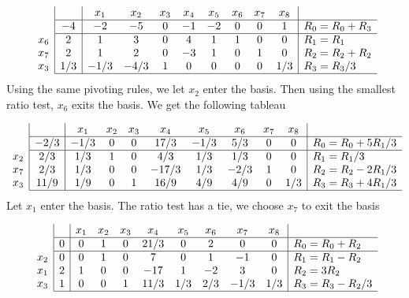 $$
\begin{array}{c}
\\
\\
x_6\\
x_7 \\
x_3 \\ 
\end{array}
\begin{array}{|c|cccccccc|l}
     & x_1 & x_2 & x_3 & x_4 & x_5 & x_6 & x_7 & x_8  \\ \hline
  -4 & -2 & -5 & 0 & -1 & -2 & 0 & 0 & 1 & R_0 = R_0 + R_3\\ \hline
   2 & 1 & 3 & 0  & 4  & 1 & 1 & 0 & 0 & R_1 = R_1\\
   2 & 1 & 2 & 0 & -3 & 1 & 0 & 1 & 0 & R_2 = R_2 + R_2\\
   1/3 & -1/3 & -4/3 & 1 & 0 & 0 & 0 & 0 & 1/3 & R_3 = R_3/3  \\ \hline
\end{array}
$$
Using the same pivoting rules, we let $x_2$ enter the basis. Then using the smallest ratio test, $x_6$ exits the basis. We get the following tableau 

$$
\begin{array}{c}
\\
\\
x_2\\
x_7 \\
x_3 \\ 
\end{array}
\begin{array}{|c|cccccccc|l}
     & x_1 & x_2 & x_3 & x_4 & x_5 & x_6 & x_7 & x_8  \\ \hline
  -2/3 & -1/3 & 0 & 0 & 17/3 & -1/3 & 5/3 & 0 & 0 & R_0 = R_0 + 5R_1/3 \\ \hline
   2/3 & 1/3 & 1 & 0  & 4/3  & 1/3 & 1/3 & 0 & 0 & R_1 = R_1/3\\
   2/3 & 1/3 & 0 & 0 & -17/3 & 1/3 & -2/3 & 1 & 0 & R_2 = R_2 - 2 R_1/3\\
   11/9 & 1/9 & 0 & 1 & 16/9 & 4/9 & 4/9 & 0 & 1/3 & R_3 = R_3 + 4R_1 /3  \\ \hline
\end{array}
$$
Let $x_1$ enter the basis. The ratio test has a tie, we choose $x_7$ to exit the basis

$$
\begin{array}{c}
\\
\\
x_2\\
x_1 \\
x_3 \\ 
\end{array}
\begin{array}{|c|cccccccc|l}
     & x_1 & x_2 & x_3 & x_4 & x_5 & x_6 & x_7 & x_8  \\ \hline
   0 & 0 & 1 & 0 & 21/3 & 0 & 2 & 0 & 0 & R_0 = R_0 + R_2 \\ \hline
   0 & 0 & 1 & 0  & 7  & 0 & 1 & -1 & 0 & R_1 = R_1 - R_2\\
   2 & 1 & 0 & 0 & -17 & 1 & -2 & 3 & 0 & R_2 = 3R_2 \\
   1 & 0 & 0 & 1 & 11/3 & 1/3 & 2/3 & -1/3 & 1/3 & R_3 = R_3 - R_2 /3  \\ \hline
\end{array}
$$

